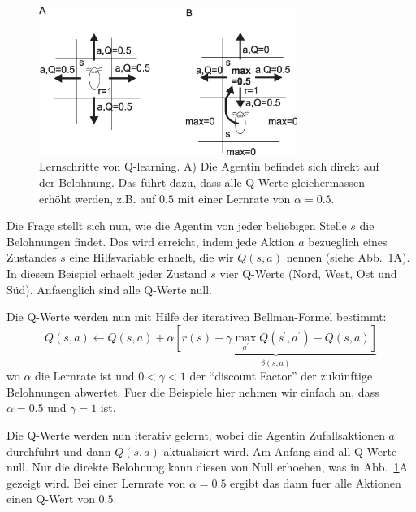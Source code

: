 \documentclass[12pt]{report}
\begin{document}
\begin{figure}[!hbt]
\begin{center}
\mbox{\includegraphics[width=0.75\textwidth]{learning_steps}}
\end{center}
\caption{Lernschritte von Q-learning. A) Die Agentin befindet
  sich direkt auf der Belohnung. Das führt dazu, dass alle
  Q-Werte gleichermassen erhöht werden, z.B. auf $0.5$ mit
  einer Lernrate von $\alpha = 0.5$.
\label{learning_steps}}
\end{figure}

Die Frage stellt sich nun, wie die Agentin von jeder beliebigen Stelle
$s$ die Belohnungen findet. Das wird erreicht, indem jede Aktion $a$
bezueglich eines Zustandes $s$ eine Hilfsvariable erhaelt, die wir
$Q(s,a)$ nennen (siehe Abb.~\ref{learning_steps}A). In diesem
Beispiel erhaelt jeder Zustand $s$ vier Q-Werte (Nord, West, Ost
und S\"ud). Anfaenglich sind alle Q-Werte null.

Die Q-Werte werden nun mit Hilfe der iterativen Bellman-Formel bestimmt:
\begin{equation}
  Q(s,a) \leftarrow Q(s,a) + \alpha \underbrace{\left[ r(s) + \gamma \max_{a^\prime} Q(s^\prime,a^\prime) - Q(s,a) \right]}_{\delta(s,a)}
  \label{bellit}
\end{equation}
wo $\alpha$ die Lernrate ist und $0 < \gamma < 1$ der ``discount
Factor'' der zukünftige Belohnungen abwertet. Fuer die Beispiele hier
nehmen wir einfach an, dass $\alpha = 0.5$ und $\gamma = 1$ ist.

Die Q-Werte werden nun iterativ gelernt, wobei die Agentin
Zufallsaktionen $a$ durchführt und dann $Q(s,a)$ aktualisiert wird.
Am Anfang sind all Q-Werte null. Nur die direkte Belohnung kann diesen
von Null erhoehen, was in Abb.~\ref{learning_steps}A gezeigt wird. Bei
einer Lernrate von $\alpha = 0.5$ ergibt das dann fuer alle Aktionen
einen Q-Wert von $0.5$.
\end{document}
